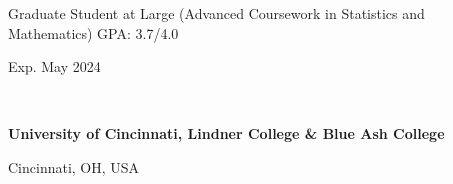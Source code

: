     	\begin{minipage}{.75\linewidth} \begin{flushleft}
    		Graduate Student at Large (Advanced Coursework in Statistics and Mathematics) \textemdash{} GPA: 3.7/4.0
    	\end{flushleft} \end{minipage}
    \hfill 
    \begin{minipage}{.20\linewidth}\begin{flushright}
    	 Exp. May 2024
    	\end{flushright}
    \end{minipage} 
    \\
    \vspace{5pt}
    \begin{minipage}{.75\linewidth} \begin{flushleft}
    		\textbf{University of Cincinnati, Lindner College \& Blue Ash College}
    	\end{flushleft} \end{minipage}
    \hfill 
    \begin{minipage}{.20\linewidth}\begin{flushright}
    	 Cincinnati, OH, USA
    	\end{flushright}\end{minipage}
    	

